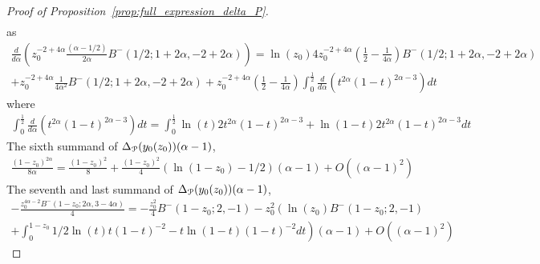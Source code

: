 \begin{proof}[Proof of Proposition~\ref{prop:full_expression_delta_P}]
\begin{align*}
\end{align*}
as
\begin{align*}
\frac{d}{d \alpha}\left( z_0^{-2 + 4 \alpha} \frac{(\alpha - 
	1/2 )}{2\alpha} B^-(1/2; 1 + 2 \alpha, 
	-2 + 2 \alpha)\right) = \ln(z_0) 4 z_0^{-2+4\alpha} \left(\frac{1}{2}-\frac{1}{4\alpha}\right)B^-(1/2;1+2\alpha,-2+2\alpha)\\
+z_0^{-2+4\alpha}\frac{1}{4\alpha^2}B^-(1/2;1+2\alpha,-2+2\alpha)+z_0^{-2+4\alpha}\left(\frac{1}{2}-\frac{1}{4\alpha}\right)\int_0^{\frac{1}{2}} \frac{d}{d\alpha}(t^{2\alpha}(1-t)^{2\alpha-3})dt
\end{align*}
where
\begin{align*}
\int_0^{\frac{1}{2}} \frac{d}{d\alpha}(t^{2\alpha}(1-t)^{2\alpha-3})dt = \int_0^{\frac{1}{2}} \ln(t)2t^{2\alpha}(1-t)^{2\alpha-3}+\ln(1-t)2t^{2\alpha}(1-t)^{2\alpha-3}dt
\end{align*}
The sixth summand of $\Delta_{{\mathcal P}}(y_0(z_0))(\alpha-1)$,
\begin{align*}
\frac{(1 - z_0)^{2 \alpha}}{8 \alpha} = \frac{(1-z_0)^2}{8}+\frac{(1-z_0)^2}{4} (\ln(1-z_0)-1/2 )(\alpha-1)+O( (\alpha-1)^2 )
\end{align*}
The seventh and last summand of $\Delta_{{\mathcal P}}(y_0(z_0))(\alpha-1)$,
\begin{align*}
- \frac{z_0^{4 \alpha - 2} B^-(1 - z_0; 2 \alpha, 3 - 4 \alpha)}{4} = -\frac{z_0^2}{4}B^-(1-z_0;2,-1) - z_0^2 \left(\ln(z_0)B^-(1-z_0;2,-1) \right. \\
\left.+\int_0^{1-z_0} 1/2\ln(t)t(1-t)^{-2}-t\ln(1-t)(1-t)^{-2}dt \right) (\alpha-1)+O((\alpha-1)^2)
\end{align*}


\end{proof}
